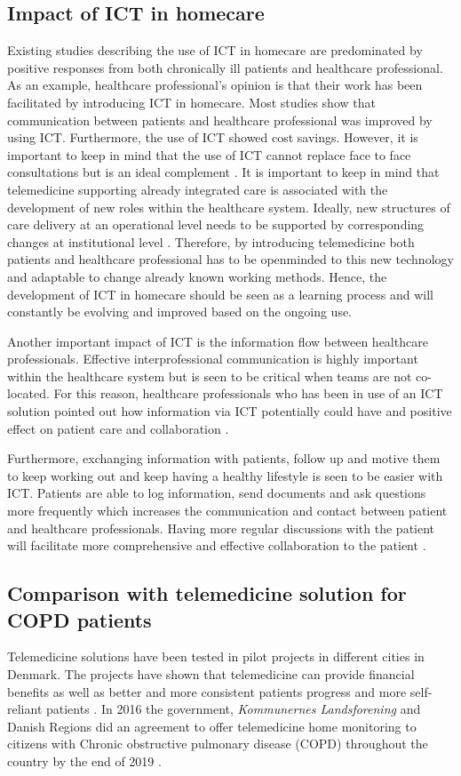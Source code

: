 \subsection{Impact of ICT in homecare}
Existing studies describing the use of ICT in homecare are predominated by positive responses from both chronically ill patients and healthcare professional. As an example, healthcare professional’s opinion is that their work has been facilitated by introducing ICT in homecare. Most studies show that communication between patients and healthcare professional was improved by using ICT. Furthermore, the use of ICT showed cost savings. However, it is important to keep in mind that the use of ICT cannot replace face to face consultations but is an ideal complement \cite{ICT}. It is important to keep in mind that telemedicine supporting already integrated care is associated with the development of new roles within the healthcare system. Ideally, new structures of care delivery at an operational level needs to be supported by corresponding changes at institutional level \cite{countries}. Therefore, by introducing telemedicine both patients and healthcare professional has to be openminded to this new technology and adaptable to change already known working methods. Hence, the development of ICT in homecare should be seen as a learning process and will constantly be evolving and improved based on the ongoing use. 

Another important impact of ICT is the information flow between healthcare professionals. Effective interprofessional communication is highly important within the healthcare system but is seen to be critical when teams are not co-located. For this reason, healthcare professionals who has been in use of an ICT solution pointed out how information via ICT potentially could have and positive effect on patient care and collaboration \cite{barrier}.

Furthermore, exchanging information with patients, follow up and motive them to keep working out and keep having a healthy lifestyle is seen to be easier with ICT. Patients are able to log information, send documents and ask questions more frequently which increases the communication and contact between patient and healthcare professionals. Having more regular discussions with the patient will facilitate more comprehensive and effective collaboration to the patient \cite{barrier}.   

\subsection{Comparison with telemedicine solution for COPD patients}
Telemedicine solutions have been tested in pilot projects in different cities in Denmark. The projects have shown that telemedicine can provide financial benefits as well as better and more consistent patients progress and more self-reliant patients \cite{KOL_1}. In 2016 the government, \textit{Kommunernes Landsforening} and Danish Regions did an agreement to offer telemedicine home monitoring to citizens with Chronic obstructive pulmonary disease (COPD) throughout the country by the end of 2019 \cite{KOL_2}. 

